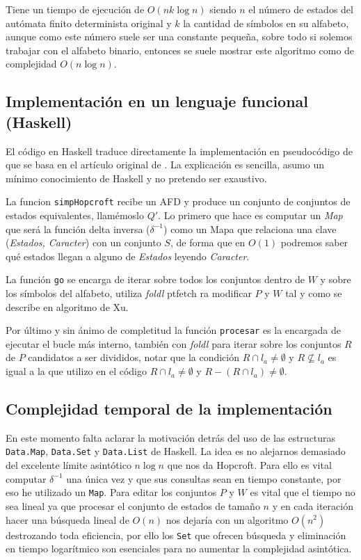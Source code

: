 \documentclass{scrartcl}
\begin{document}
Tiene un tiempo de ejecución de $O(n k \log n)$ siendo $n$ el número de estados del autómata finito determinista original y $k$ la cantidad de símbolos en su alfabeto, aunque como este número suele ser una constante pequeña, sobre todo si solemos trabajar con el alfabeto binario, entonces se suele mostrar este algoritmo como de complejidad $O(n\log n)$. 

\subsection{Implementación en un lenguaje funcional (Haskell)}
El código en Haskell traduce directamente la implementación en pseudocódigo de \cite{xu2009} que se basa en el artículo original de \cite{hopcroft71}.
La explicación es sencilla, asumo un mínimo conocimiento de Haskell y no pretendo ser exaustivo.

La funcion \texttt{simpHopcroft} recibe un AFD y produce un conjunto de conjuntos de estados equivalentes, llamémoslo $Q'$. Lo primero que hace es computar un \textit{Map} que será la función delta inversa ($\delta^{-1}$) como un Mapa que relaciona una clave (\textit{Estados, Caracter}) con un conjunto $S$, de forma que en $O(1)$ podremos saber qué estados llegan a alguno de \textit{Estados} leyendo \textit{Caracter}.

La función \texttt{go} se encarga de iterar sobre todos los conjuntos dentro de $W$ y sobre los símbolos del alfabeto, utiliza \textit{foldl} ptfetch
ra modificar $P$ y $W$ tal y como se describe en algoritmo de Xu.

Por último y sin ánimo de completitud la función \texttt{procesar} es la encargada de ejecutar el bucle más interno, también con \textit{foldl} para iterar sobre los conjuntos $R$ de $P$ candidatos a ser divididos, notar que la condición $R \cap l_a \neq \emptyset$ y $R \nsubseteq l_a$ es igual a la que utilizo en el código $R \cap l_a \neq \emptyset$ y $R - (R \cap l_a) \neq \emptyset$.

\subsection{Complejidad temporal de la implementación}
En este momento falta aclarar la motivación detrás del uso de las estructuras \texttt{Data.Map}, \texttt{Data.Set} y \texttt{Data.List} de Haskell. La idea es no alejarnos demasiado del excelente límite asintótico $n\log n$ que nos da Hopcroft. Para ello es vital computar $\delta^{-1}$ una única vez y que sus consultas sean en tiempo constante, por eso he utilizado un \texttt{Map}. Para editar los conjuntos $P$ y $W$ es vital que el tiempo no sea lineal ya que procesar el conjunto de estados de tamaño $n$ y en cada iteración hacer una búsqueda lineal de $O(n)$ nos dejaría con un algoritmo $O(n^2)$ destrozando toda eficiencia, por ello los \texttt{Set} que ofrecen búsqueda y eliminación en tiempo logarítmico son esenciales para no aumentar la complejidad asintótica.

\newpage
\renewcommand{\refname}{Referencias}


\end{document}

